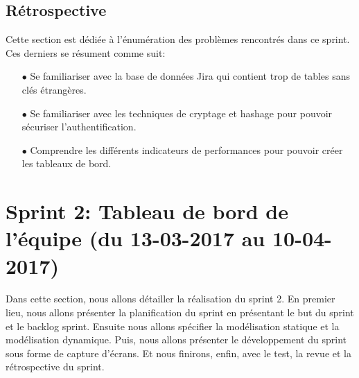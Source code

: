\subsection{Rétrospective}
Cette section est dédiée à l'énumération des problèmes rencontrés dans ce sprint. Ces derniers se résument comme suit:
\begin{itemize}
    \item[$\bullet$] Se familiariser avec la base de données Jira qui contient trop de tables sans clés étrangères.
    \item[$\bullet$] Se familiariser avec les techniques de cryptage et hashage pour pouvoir sécuriser l'authentification.
    \item[$\bullet$] Comprendre les différents indicateurs de performances pour pouvoir créer les tableaux de bord.
\end{itemize}

\section{Sprint 2: Tableau de bord de l'équipe (du 13-03-2017 au 10-04-2017)}
Dans cette section, nous allons détailler la réalisation du sprint 2. En premier lieu, nous allons présenter la planification du sprint en présentant le but du sprint et le backlog sprint. Ensuite nous allons spécifier la modélisation statique et la modélisation dynamique. Puis, nous allons présenter le développement du sprint sous forme de capture d'écrans. Et nous finirons, enfin, avec le test, la revue et la rétrospective du sprint.

